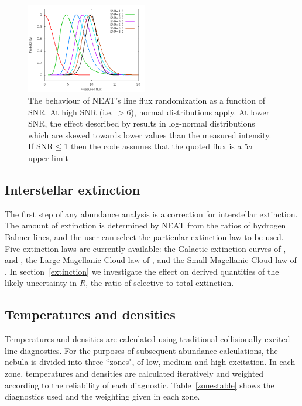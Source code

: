 \documentclass[useAMS,usenatbib]{mn2e}
\begin{document}
\begin{figure}
\label{distributions}
\includegraphics[width=0.47\textwidth]{figures/distributions_2.png}
\caption{The behaviour of NEAT's line flux randomization as a function of SNR.  At high SNR (i.e. $>$6), normal distributions apply.  At lower SNR, the effect described by \citet{1994A&A...287..676R} results in log-normal distributions which are skewed towards lower values than the measured intensity.  If SNR$\leq$1 then the code assumes that the quoted flux is a 5$\sigma$ upper limit}
\end{figure}

\subsection{Interstellar extinction}

The first step of any abundance analysis is a correction for interstellar extinction.  The amount of extinction is determined by NEAT from the ratios of hydrogen Balmer lines, and the user can select the particular extinction law to be used.  Five extinction laws are currently available: the Galactic extinction curves of \citet{1983MNRAS.203..301H}, \citet{1990ApJS...72..163F} and \citet{1989ApJ...345..245C}, the Large Magellanic Cloud law of \citet{1983MNRAS.203..301H}, and the Small Magellanic Cloud law of \citet{1984A&A...132..389P}.  In section~\ref{extinction} we investigate the effect on derived quantities of the likely uncertainty in $R$, the ratio of selective to total extinction.

\subsection{Temperatures and densities}

Temperatures and densities are calculated using traditional collisionally excited line diagnostics.  For the purposes of subsequent abundance calculations, the nebula is divided into three ``zones", of low, medium and high excitation.  In each zone, temperatures and densities are calculated iteratively and weighted according to the reliability of each diagnostic.  Table~\ref{zonestable} shows the diagnostics used and the weighting given in each zone.
\end{document}
